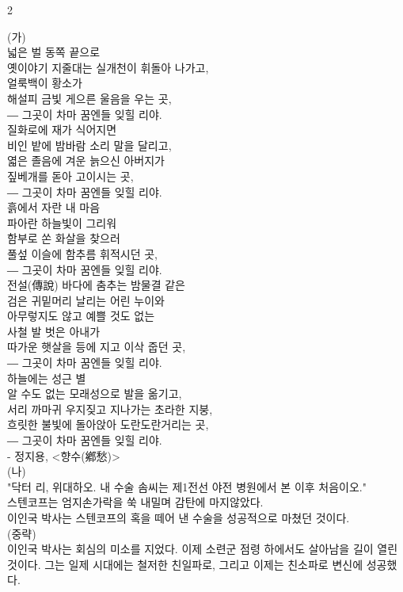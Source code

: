 \documentclass[10pt, a4paper]{article}
\begin{document}
\begin{multicols}{2}
\begin{passagebox}
\noindent{}(가) \\
넓은 벌 동쪽 끝으로 \\
옛이야기 지줄대는 실개천이 휘돌아 나가고, \\
얼룩백이 황소가 \\
해설피 금빛 게으른 울음을 우는 곳, \\
― 그곳이 차마 꿈엔들 잊힐 리야.
\\[0.5em]
질화로에 재가 식어지면 \\
비인 밭에 밤바람 소리 말을 달리고, \\
엷은 졸음에 겨운 늙으신 아버지가 \\
짚베개를 돋아 고이시는 곳, \\
― 그곳이 차마 꿈엔들 잊힐 리야.
\\[0.5em]
흙에서 자란 내 마음 \\
파아란 하늘빛이 그리워 \\
함부로 쏜 화살을 찾으러 \\
풀섶 이슬에 함추름 휘적시던 곳, \\
― 그곳이 차마 꿈엔들 잊힐 리야.
\\[0.5em]
전설(傳說) 바다에 춤추는 밤물결 같은 \\
검은 귀밑머리 날리는 어린 누이와 \\
아무렇지도 않고 예쁠 것도 없는 \\
사철 발 벗은 아내가 \\
따가운 햇살을 등에 지고 이삭 줍던 곳, \\
― 그곳이 차마 꿈엔들 잊힐 리야.
\\[0.5em]
하늘에는 성근 별 \\
알 수도 없는 모래성으로 발을 옮기고, \\
서리 까마귀 우지짖고 지나가는 초라한 지붕, \\
흐릿한 불빛에 돌아앉아 도란도란거리는 곳, \\
― 그곳이 차마 꿈엔들 잊힐 리야.
\\[0.5em]
- 정지용, <향수(鄕愁)>
\\[0.5em]
(나) \\
"닥터 리, 위대하오. 내 수술 솜씨는 제1전선 야전 병원에서 본 이후 처음이오." \\
스텐코프는 엄지손가락을 쑥 내밀며 감탄에 마지않았다. \\
이인국 박사는 스텐코프의 혹을 떼어 낸 수술을 성공적으로 마쳤던 것이다. \\
(중략) \\
이인국 박사는 회심의 미소를 지었다. 이제 소련군 점령 하에서도 살아남을 길이 열린 것이다. 그는 일제 시대에는 철저한 친일파로, 그리고 이제는 친소파로 변신에 성공했다.

\end{passagebox}
\end{multicols}
\end{document}
